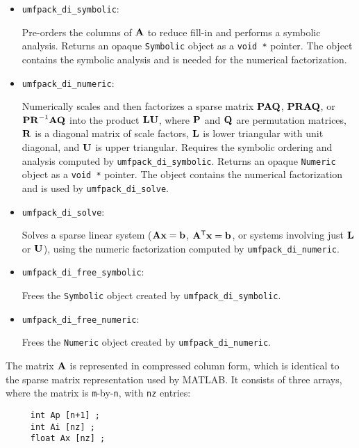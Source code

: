 \documentclass[11pt]{article}
\newcommand{\m}[1]{{\bf{#1}}}       %
\newcommand{\tr}{^{\sf T}}          %
\begin{document}
\begin{itemize}
\item {\tt umfpack\_di\_symbolic}:

    Pre-orders the columns of $\m{A}$ to reduce fill-in and performs a
    symbolic analysis.
    Returns an opaque {\tt Symbolic} object as a {\tt void *}
    pointer.  The object contains the symbolic analysis and is needed for the
    numerical factorization.

\item {\tt umfpack\_di\_numeric}:

    Numerically scales and then factorizes a sparse matrix
    $\m{PAQ}$, $\m{PRAQ}$, or $\m{PR}^{-1}\m{AQ}$ into the product $\m{LU}$,
    where
    $\m{P}$ and $\m{Q}$ are permutation matrices, $\m{R}$ is a diagonal
    matrix of scale factors, $\m{L}$ is lower triangular with unit diagonal,
    and $\m{U}$ is upper triangular.  Requires the
    symbolic ordering and analysis computed by {\tt umfpack\_di\_symbolic}.
    Returns an opaque {\tt Numeric} object as a
    {\tt void *} pointer.  The object contains the numerical factorization and
    is used by {\tt umfpack\_di\_solve}.

\item {\tt umfpack\_di\_solve}:

    Solves a sparse linear system ($\m{Ax}=\m{b}$, $\m{A}\tr\m{x}=\m{b}$, or
    systems involving just $\m{L}$ or $\m{U}$), using the numeric factorization
    computed by {\tt umfpack\_di\_numeric}.

\item {\tt umfpack\_di\_free\_symbolic}:

    Frees the {\tt Symbolic} object created by {\tt umfpack\_di\_symbolic}.

\item {\tt umfpack\_di\_free\_numeric}:

    Frees the {\tt Numeric} object created by {\tt umfpack\_di\_numeric}.

\end{itemize}

The matrix $\m{A}$ is represented in compressed column form, which is
identical to the sparse matrix representation used by MATLAB.  It consists
of three arrays, where the matrix is {\tt m}-by-{\tt n},
with {\tt nz} entries:

{\footnotesize
\begin{verbatim}
     int Ap [n+1] ;
     int Ai [nz] ;
     float Ax [nz] ;
\end{verbatim}
}
\end{document}
